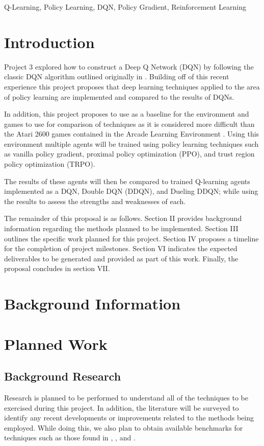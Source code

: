 \documentclass[conference]{IEEEtran}
\begin{document}
\begin{IEEEkeywords}
Q-Learning, Policy Learning, DQN, Policy Gradient, Reinforcement Learning
\end{IEEEkeywords}

\section{Introduction}
Project 3 explored how to construct a Deep Q Network (DQN) by following the classic DQN algorithm outlined originally in \cite{DQNOriginalPaper}.
Building off of this recent experience this project proposes that deep learning techniques applied to the area of policy learning are implemented and compared to the results of DQNs.

In addition, this project proposes to use \cite{bhonker2017playing} as a baseline for the environment and games to use for comparison of techniques as it is considered more difficult than the Atari 2600 games contained in the Arcade Learning Environment \cite{Bellemare_2013}.
Using this environment multiple agents will be trained using policy learning techniques such as vanilla policy gradient, proximal policy optimization (PPO), and trust region policy optimization (TRPO).

The results of these agents will then be compared to trained Q-learning agents implemented as a DQN, Double DQN (DDQN), and Dueling DDQN; while using the results to assess the strengths and weaknesses of each.

The remainder of this proposal is as follows.
Section II provides background information regarding the methods planned to be implemented.
Section III outlines the specific work planned for this project.
Section IV proposes a timeline for the completion of project milestones.
Section VI indicates the expected deliverables to be generated and provided as part of this work.
Finally, the proposal concludes in section VII.

\section{Background Information}

\section{Planned Work}

\subsection{Background Research}
Research is planned to be performed to understand all of the techniques to be exercised during this project.
In addition, the literature will be surveyed to identify any recent developments or improvements related to the methods being employed.
While doing this, we also plan to obtain available benchmarks for techniques such as those found in \cite{DQNOriginalPaper}, \cite{NatureDeepLearning}, and \cite{bhonker2017playing}.
\end{document}
